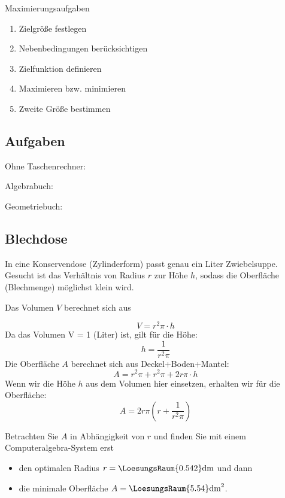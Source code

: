 \newpage
  \begin{rezept}{Maximierungsaufgaben}{}
    \begin{enumerate}
    \item Zielgröße festlegen
    \item Nebenbedingungen berücksichtigen
    \item Zielfunktion definieren
    \item Maximieren bzw. minimieren
    \item Zweite Größe bestimmen
      \end{enumerate}
\end{rezept}
  

\subsection*{Aufgaben}
Ohne Taschenrechner:

Algebrabuch:


Geometriebuch:

\newpage


\subsection{Blechdose}
In eine Konservendose (Zylinderform) passt genau ein Liter Zwiebelsuppe. Gesucht ist das Verhältnis von Radius $r$ zur Höhe $h$, sodass die Oberfläche (Blechmenge) möglichst klein wird.

Das Volumen $V$ berechnet sich aus

$$V = r^2\pi\cdot{}h$$
Da das Volumen V = 1 (Liter) ist, gilt für die Höhe:
$$h = \frac{1}{r^2\pi}$$
Die Oberfläche $A$ berechnet sich aus Deckel+Boden+Mantel:  
$$A=r^2\pi + r^2\pi + 2r\pi\cdot{}h$$
Wenn wir die Höhe $h$ aus dem Volumen hier einsetzen, erhalten wir für die Oberfläche:
$$A=2r\pi\left(r+\frac{1}{r^2\pi}\right)$$

Betrachten Sie $A$ in Abhängigkeit von $r$ und finden Sie mit einem
Computeralgebra-System erst
\begin{itemize}
\item
  den optimalen Radius $r=\LoesungsRaum{0.542}\textrm{dm}$ und dann
\item
  die minimale Oberfläche $A= \LoesungsRaum{5.54}\textrm{dm}^2$.
\end{itemize}
